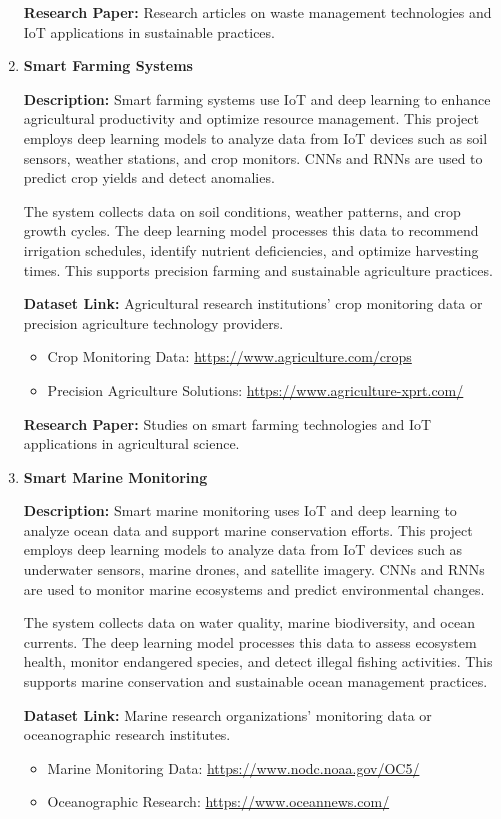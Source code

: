 \documentclass{article}
\begin{document}
\begin{enumerate}[label=\textbf{\arabic*.}, leftmargin=*]
\textbf{Research Paper:} Research articles on waste management technologies and IoT applications in sustainable practices.

\item \textbf{Smart Farming Systems}

\textbf{Description:}
Smart farming systems use IoT and deep learning to enhance agricultural productivity and optimize resource management. This project employs deep learning models to analyze data from IoT devices such as soil sensors, weather stations, and crop monitors. CNNs and RNNs are used to predict crop yields and detect anomalies.

The system collects data on soil conditions, weather patterns, and crop growth cycles. The deep learning model processes this data to recommend irrigation schedules, identify nutrient deficiencies, and optimize harvesting times. This supports precision farming and sustainable agriculture practices.

\textbf{Dataset Link:} Agricultural research institutions' crop monitoring data or precision agriculture technology providers.
\begin{itemize}
    \item Crop Monitoring Data: \url{https://www.agriculture.com/crops}
    \item Precision Agriculture Solutions: \url{https://www.agriculture-xprt.com/}
\end{itemize}

\textbf{Research Paper:} Studies on smart farming technologies and IoT applications in agricultural science.

\item \textbf{Smart Marine Monitoring}

\textbf{Description:}
Smart marine monitoring uses IoT and deep learning to analyze ocean data and support marine conservation efforts. This project employs deep learning models to analyze data from IoT devices such as underwater sensors, marine drones, and satellite imagery. CNNs and RNNs are used to monitor marine ecosystems and predict environmental changes.

The system collects data on water quality, marine biodiversity, and ocean currents. The deep learning model processes this data to assess ecosystem health, monitor endangered species, and detect illegal fishing activities. This supports marine conservation and sustainable ocean management practices.

\textbf{Dataset Link:} Marine research organizations' monitoring data or oceanographic research institutes.
\begin{itemize}
    \item Marine Monitoring Data: \url{https://www.nodc.noaa.gov/OC5/}
    \item Oceanographic Research: \url{https://www.oceannews.com/}
\end{itemize}


\end{enumerate}
\end{document}
